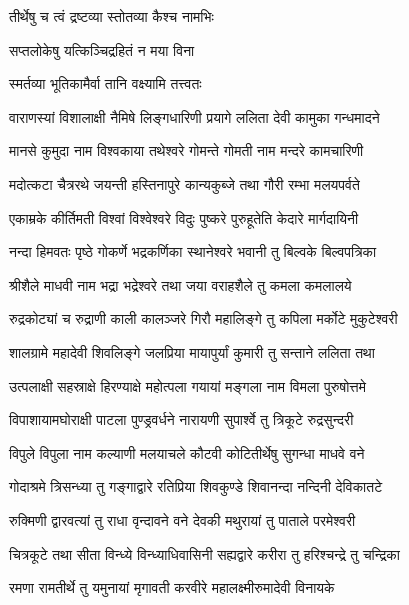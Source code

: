 
{तीर्थेषु च त्वं द्रष्टव्या स्तोतव्या कैश्च नामभिः}

{सप्तलोकेषु यत्किञ्चिद्रहितं न मया विना}

{स्मर्तव्या भूतिकामैर्वा तानि वक्ष्यामि तत्त्वतः}

\twolineshloka
{वाराणस्यां विशालाक्षी नैमिषे लिङ्गधारिणी}
{प्रयागे ललिता देवी कामुका गन्धमादने}

\twolineshloka
{मानसे कुमुदा नाम विश्वकाया तथेश्वरे}
{गोमन्ते गोमती नाम मन्दरे कामचारिणी}

\twolineshloka
{मदोत्कटा चैत्ररथे जयन्ती हस्तिनापुरे}
{कान्यकुब्जे तथा गौरी रम्भा मलयपर्वते}

\twolineshloka
{एकाम्रके कीर्तिमती विश्वां विश्वेश्वरे विदुः}
{पुष्करे पुरुहूतेति केदारे मार्गदायिनी}

\twolineshloka
{नन्दा हिमवतः पृष्ठे गोकर्णे भद्रकर्णिका}
{स्थानेश्वरे भवानी तु बिल्वके बिल्वपत्रिका}

\twolineshloka
{श्रीशैले माधवी नाम भद्रा भद्रेश्वरे तथा}
{जया वराहशैले तु कमला कमलालये}

\twolineshloka
{रुद्रकोट्यां च रुद्राणी काली कालञ्जरे गिरौ}
{महालिङ्गे तु कपिला मर्कोटे मुकुटेश्वरी}

\twolineshloka
{शालग्रामे महादेवी शिवलिङ्गे जलप्रिया}
{मायापुर्यां कुमारी तु सन्ताने ललिता तथा}

\twolineshloka
{उत्पलाक्षी सहस्राक्षे हिरण्याक्षे महोत्पला}
{गयायां मङ्गला नाम विमला पुरुषोत्तमे}

\twolineshloka
{विपाशायामघोराक्षी पाटला पुण्ड्रवर्धने}
{नारायणी सुपार्श्वे तु त्रिकूटे रुद्रसुन्दरी}

\twolineshloka
{विपुले विपुला नाम कल्याणी मलयाचले}
{कौटवी कोटितीर्थेषु सुगन्धा माधवे वने}

\twolineshloka
{गोदाश्रमे त्रिसन्ध्या तु गङ्गाद्वारे रतिप्रिया}
{शिवकुण्डे शिवानन्दा नन्दिनी देविकातटे}

\twolineshloka
{रुक्मिणी द्वारवत्यां तु राधा वृन्दावने वने}
{देवकी मथुरायां तु पाताले परमेश्वरी}

\twolineshloka
{चित्रकूटे तथा सीता विन्ध्ये विन्ध्याधिवासिनी}
{सह्यद्वारे करीरा तु हरिश्चन्द्रे तु चन्द्रिका}

\twolineshloka
{रमणा रामतीर्थे तु यमुनायां मृगावती}
{करवीरे महालक्ष्मीरुमादेवी विनायके}

